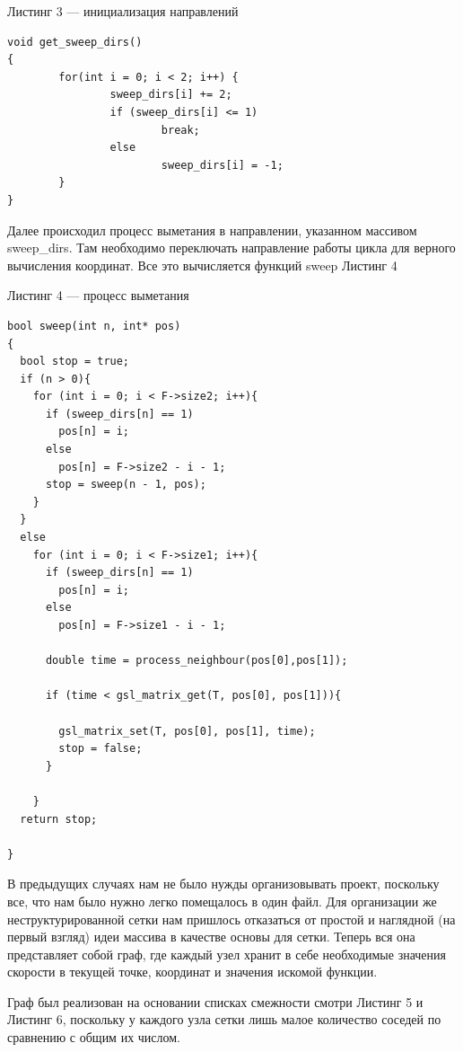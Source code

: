 \documentclass[a4paper,12pt]{article}
\begin{document}
\vspace{1em}
Листинг 3 --- инициализация направлений
\normalsize
\begin{verbatim} 
void get_sweep_dirs()
{
        for(int i = 0; i < 2; i++) {
                sweep_dirs[i] += 2;
                if (sweep_dirs[i] <= 1)
                        break;
                else
                        sweep_dirs[i] = -1;
        }
}

\end{verbatim}
\large

Далее происходил процесс выметания в направлении, указанном массивом
sweep\_dirs. Там необходимо переключать направление работы цикла для
верного вычисления координат. Все это вычисляется функций sweep
Листинг 4


\vspace{1em}
Листинг 4 --- процесс выметания
\normalsize
\begin{verbatim} 
bool sweep(int n, int* pos)
{
  bool stop = true;
  if (n > 0){
    for (int i = 0; i < F->size2; i++){
      if (sweep_dirs[n] == 1)
        pos[n] = i;
      else
        pos[n] = F->size2 - i - 1;
      stop = sweep(n - 1, pos);
    }
  }
  else
    for (int i = 0; i < F->size1; i++){
      if (sweep_dirs[n] == 1)
        pos[n] = i;
      else
        pos[n] = F->size1 - i - 1;

      double time = process_neighbour(pos[0],pos[1]);

      if (time < gsl_matrix_get(T, pos[0], pos[1])){
               
        gsl_matrix_set(T, pos[0], pos[1], time);
        stop = false;
      } 

    }
  return stop;

}
\end{verbatim}
\large

В предыдущих случаях нам не было нужды организовывать проект,
поскольку все, что нам было нужно легко помещалось в один файл. Для
организации же неструктурированной сетки нам пришлось отказаться от
простой и наглядной (на первый взгляд) идеи массива в качестве основы
для сетки. Теперь вся она представляет собой граф, где каждый узел
хранит в себе необходимые значения скорости в текущей точке, координат
и значения искомой функции.

Граф был реализован на основании списках смежности смотри Листинг 5 и
Листинг 6, поскольку у каждого узла сетки лишь малое количество
соседей по сравнению с общим их числом.
\end{document}
